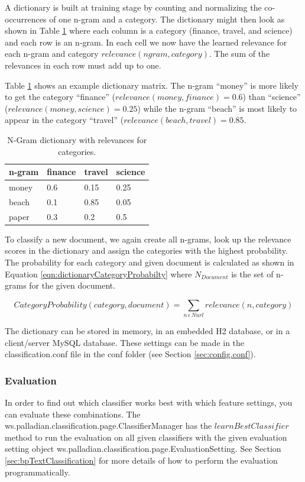 A dictionary is built at training stage by counting and normalizing the co-occurrences of one n-gram and a category. The dictionary might then look as shown in Table \ref{tab:dictionary} where each column is a category (finance, travel, and science) and each row is an n-gram. In each cell we now have the learned relevance for each n-gram and category $relevance(ngram,category)$. The sum of the relevances in each row must add up to one.

Table \ref{tab:dictionary} shows an example dictionary matrix. The n-gram ``money'' is more likely to get the category ``finance'' ($relevance(money,finance) = 0.6$) than ``science'' ($relevance(money,science) = 0.25$) while the n-gram ``beach'' is most likely to appear in the category ``travel'' ($relevance(beach,travel) = 0.85$.

\begin{table}[ht]
\centering
\begin{tabular}{|l|l|l|l|}
\hline
n-gram   & finance & travel & science \\
\hline
money	   & 0.6	&	0.15	&	0.25	\\
\hline
beach	& 0.1	&	0.85	&	0.05	\\
\hline
paper	   & 0.3 &	0.2	&	0.5	\\
\hline
\end{tabular} 
\caption{N-Gram dictionary with relevances for categories.}
\label{tab:dictionary}
\end{table}

To classify a new document, we again create all n-grams, look up the relevance scores in the dictionary and assign the categories with the highest probability. The probability for each category and given document is calculated as shown in Equation \ref{eqn:dictionaryCategoryProbabilty} where $N_{Document}$ is the set of n-grams for the given document.

\begin{equation}
\label{eqn:dictionaryCategoryProbabilty}
\mbox{$CategoryProbability(category,document)$} = \sum_{n\,\epsilon\, Nurl} \mbox{$relevance(n,category)$}
\end{equation}

The dictionary can be stored in memory, in an embedded H2 database, or in a client/server MySQL database. These settings can be made in the classification.conf file in the conf folder (see Section \ref{sec:config.conf}).


\subsubsection{Evaluation}
In order to find out which classifier works best with which feature settings, you can evaluate these combinations. The ws.palladian.classification.page.ClassifierManager has the $learnBestClassifier$ method to run the evaluation on all given classifiers with the given evaluation setting object ws.palladian.classification.page.EvaluationSetting. See Section \ref{sec:bpTextClassification} for more details of how to perform the evaluation programmatically.

